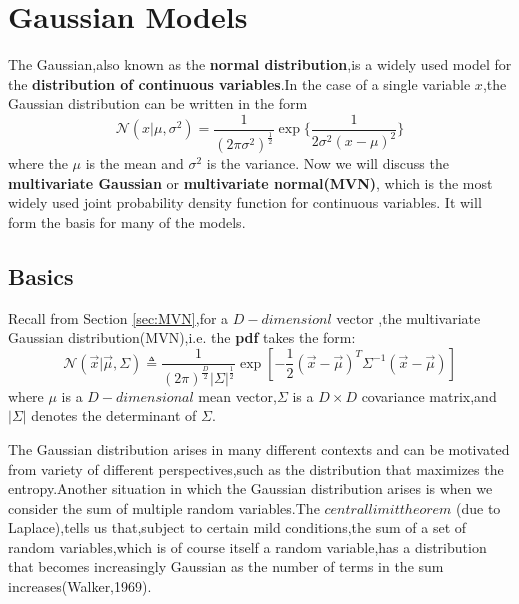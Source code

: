 \chapter{Gaussian Models}
\label{chap:Gaussian Models}
The Gaussian,also known as the \textbf{normal distribution},is a widely used model for the \textbf{distribution of continuous variables}.In the case of a single variable $x$,the Gaussian distribution can be written in the form
\begin{equation}
	\mathcal{N}(x|\mu,\sigma^2) = \dfrac{1}{(2\pi\sigma^2)^{\frac{1}{2}}}\exp\{\dfrac{1}{2\sigma^2 (x-\mu)^2} \}
\end{equation}
where the $\mu$ is the mean and $\sigma^2$ is the variance.
Now we will discuss the \textbf{multivariate Gaussian} or \textbf{multivariate normal(MVN)}, which is the most widely used joint probability density function for continuous variables. It will form the basis for many of the models.

\section{Basics}
Recall from Section \ref{sec:MVN},for a $D-dimensionl$ vector ,the multivariate Gaussian distribution(MVN),i.e. the \textbf{pdf} takes the form:
\begin{equation}
\mathcal{N}(\vec{x}|\vec{\mu},\Sigma) \triangleq \dfrac{1}{(2\pi)^{\frac{D}{2}}|\Sigma|^{\frac{1}{2}}}\exp\left[-\dfrac{1}{2}(\vec{x}-\vec{\mu})^T\Sigma^{-1}(\vec{x}-\vec{\mu})\right]
\end{equation}
where $\mu$ is a $D-dimensional$ mean vector,$\Sigma$ is a $D\times D$ covariance matrix,and $|\Sigma|$ denotes the determinant of $\Sigma$.

The Gaussian distribution arises in many different contexts and can be motivated from variety of different
perspectives,such as the distribution that maximizes the entropy.Another situation in which the Gaussian distribution arises is when we consider the sum of multiple random variables.The $central limit theorem$ (due to Laplace),tells us that,subject to certain mild conditions,the sum of a set of random variables,which is of course itself a random variable,has a distribution that becomes increasingly Gaussian as the number of terms in the sum increases(Walker,1969).

